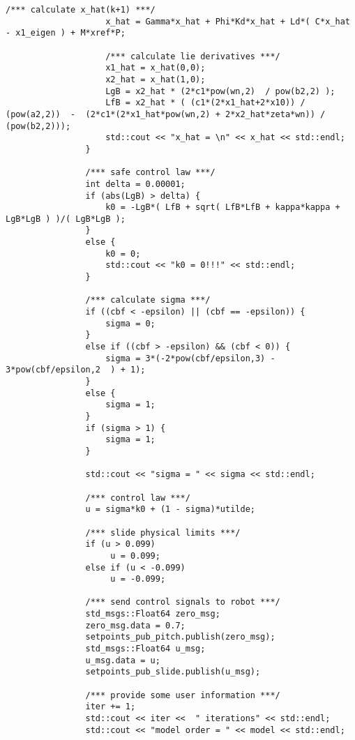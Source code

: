 \begin{lstlisting}[language=gedit]
                    /*** calculate x_hat(k+1) ***/
                    x_hat = Gamma*x_hat + Phi*Kd*x_hat + Ld*( C*x_hat - x1_eigen ) + M*xref*P;

                    /*** calculate lie derivatives ***/
                    x1_hat = x_hat(0,0);
                    x2_hat = x_hat(1,0);
                    LgB = x2_hat * (2*c1*pow(wn,2)  / pow(b2,2) );
                    LfB = x2_hat * ( (c1*(2*x1_hat+2*x10)) / (pow(a2,2))  -  (2*c1*(2*x1_hat*pow(wn,2) + 2*x2_hat*zeta*wn)) / (pow(b2,2)));          
                    std::cout << "x_hat = \n" << x_hat << std::endl;
                }

                /*** safe control law ***/
                int delta = 0.00001;
                if (abs(LgB) > delta) {
                    k0 = -LgB*( LfB + sqrt( LfB*LfB + kappa*kappa + LgB*LgB ) )/( LgB*LgB );
                }
                else {
                    k0 = 0;
                    std::cout << "k0 = 0!!!" << std::endl;
                }          
 
                /*** calculate sigma ***/
                if ((cbf < -epsilon) || (cbf == -epsilon)) {
                    sigma = 0;
                }
                else if ((cbf > -epsilon) && (cbf < 0)) {
                    sigma = 3*(-2*pow(cbf/epsilon,3) - 3*pow(cbf/epsilon,2	) + 1);
                }
                else {
                    sigma = 1;
                }
                if (sigma > 1) {
                    sigma = 1;
                }
               
                std::cout << "sigma = " << sigma << std::endl;

                /*** control law ***/
                u = sigma*k0 + (1 - sigma)*utilde;

                /*** slide physical limits ***/
                if (u > 0.099)
                     u = 0.099;
                else if (u < -0.099)
                     u = -0.099;
                
                /*** send control signals to robot ***/
		        std_msgs::Float64 zero_msg;
		        zero_msg.data = 0.7;
                setpoints_pub_pitch.publish(zero_msg);
		        std_msgs::Float64 u_msg;
		        u_msg.data = u;
                setpoints_pub_slide.publish(u_msg);

                /*** provide some user information ***/
                iter += 1;
                std::cout << iter <<  " iterations" << std::endl;
                std::cout << "model order = " << model << std::endl;


\end{lstlisting}
